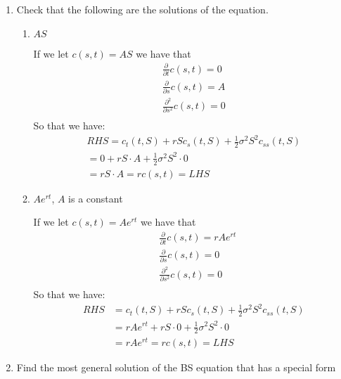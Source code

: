 \documentclass[12pt,twoside, letter]{exam}
\theoremstyle{definition}
\begin{document}
\begin{enumerate}
  \item Check that the following are the solutions of the equation.
    \begin{enumerate}
      \item $AS$
        \begin{solution}
          If we let $c(s,t) = AS$ we have that
          \begin{align*}
            \frac{\partial}{\partial t} c(s,t) = 0 \\
            \frac{\partial}{\partial s} c(s,t) = A \\
            \frac{\partial^2}{\partial s^2} c(s,t) = 0 \\
          \end{align*}
          So that we have:
          \begin{align*}
            RHS = c_t(t,S) + rSc_s(t,S) + \frac{1}{2} \sigma^2 S^2c_{ss}(t,S) \\
            = 0 + rS\cdot A + \frac{1}{2} \sigma^2 S^2 \cdot 0 \\
            = rS \cdot A = r c(s,t) = LHS
          \end{align*}
        \end{solution}
      \item $Ae^{rt}$, $A$ is a constant
        \begin{solution}
          If we let $c(s,t) = Ae^{rt}$ we have that
          \begin{align*}
            &\frac{\partial}{\partial t} c(s,t) = rAe^{rt} \\
            &\frac{\partial}{\partial s} c(s,t) = 0 \\
            &\frac{\partial^2}{\partial s^2} c(s,t) = 0 \\
          \end{align*}
          So that we have:
          \begin{align*}
            RHS &= c_t(t,S) + rSc_s(t,S) + \frac{1}{2} \sigma^2 S^2c_{ss}(t,S) \\
            &= rAe^{rt} + rS\cdot 0 + \frac{1}{2} \sigma^2 S^2 \cdot 0 \\
            &= rAe^{rt} = r c(s,t) = LHS
          \end{align*}
        \end{solution}
    \end{enumerate}
  \item Find the most general solution of the BS equation that has a special form
    \begin{enumerate}

\end{enumerate}
\end{enumerate}
\end{document}
